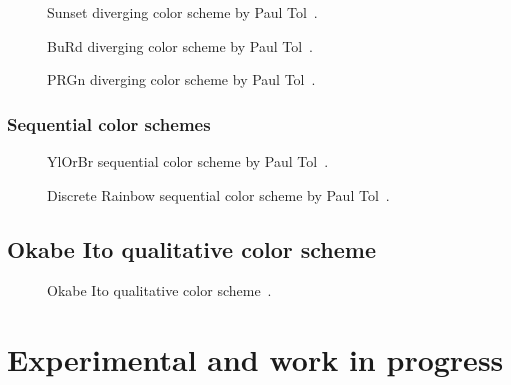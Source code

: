 \documentclass{article}
\begin{document}
\begin{figure}[ht]
    \centering
    \caption{Sunset diverging color scheme by Paul Tol~\cite{Tol}.}
    \label{fig:T_D_S}
\end{figure}

\begin{figure}[ht]
    \centering
    \caption{BuRd diverging color scheme by Paul Tol~\cite{Tol}.}
    \label{fig:T_D_BR}
\end{figure}

\begin{figure}[ht]
    \centering
    \caption{PRGn diverging color scheme by Paul Tol~\cite{Tol}.}
    \label{fig:T_D_PG}
\end{figure}

\subsubsection{Sequential color schemes}

\begin{figure}[ht]
    \centering
    \caption{YlOrBr sequential color scheme by Paul Tol~\cite{Tol}.}
    \label{fig:T_S_YB}
\end{figure}

\begin{figure}[ht]
    \centering
    \caption{Discrete Rainbow sequential color scheme by Paul Tol~\cite{Tol}.}
    \label{fig:T_S_DR}
\end{figure}

\subsection{Okabe Ito qualitative color scheme}

\begin{figure}[ht]
    \centering
    \caption{Okabe Ito qualitative color scheme~\cite{Ichihara_2008}.}
    \label{fig:OI}
\end{figure}


\section{Experimental and work in progress}

\let\oldcolor\color

\newcommand\normalvision{%
    \protect\renewcommand\color[1]{\oldcolor{##1}}%
}
\end{document}
